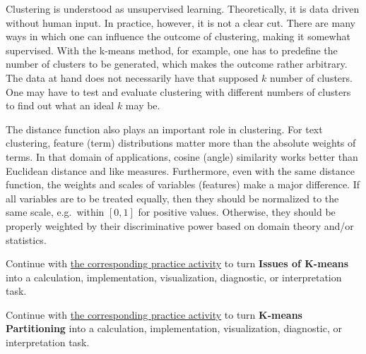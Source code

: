 \documentclass[
  letterpaper,
]{scrbook}
\begin{document}
Clustering is understood as unsupervised learning. Theoretically, it is
data driven without human input. In practice, however, it is not a clear
cut. There are many ways in which one can influence the outcome of
clustering, making it somewhat supervised. With the k-means method, for
example, one has to predefine the number of clusters to be generated,
which makes the outcome rather arbitrary. The data at hand does not
necessarily have that supposed \(k\) number of clusters. One may have to
test and evaluate clustering with different numbers of clusters to find
out what an ideal \(k\) may be.

The distance function also plays an important role in clustering. For
text clustering, feature (term) distributions matter more than the
absolute weights of terms. In that domain of applications, cosine
(angle) similarity works better than Euclidean distance and like
measures. Furthermore, even with the same distance function, the weights
and scales of variables (features) make a major difference. If all
variables are to be treated equally, then they should be normalized to
the same scale, e.g.~within \([0,1]\) for positive values. Otherwise,
they should be properly weighted by their discriminative power based on
domain theory and/or statistics.

\begin{tcolorbox}[enhanced jigsaw, arc=.35mm, bottomrule=.15mm, bottomtitle=1mm, breakable, colback=white, colbacktitle=quarto-callout-tip-color!10!white, colframe=quarto-callout-tip-color-frame, coltitle=black, left=2mm, leftrule=.75mm, opacityback=0, opacitybacktitle=0.6, rightrule=.15mm, title=\textcolor{quarto-callout-tip-color}{\faLightbulb}\hspace{0.5em}{Put it into practice}, titlerule=0mm, toprule=.15mm, toptitle=1mm]

Continue with \hyperref[sec-pr-10-issues-of-k-means]{the corresponding
practice activity} to turn \textbf{Issues of K-means} into a
calculation, implementation, visualization, diagnostic, or
interpretation task.

\end{tcolorbox}

\begin{tcolorbox}[enhanced jigsaw, arc=.35mm, bottomrule=.15mm, bottomtitle=1mm, breakable, colback=white, colbacktitle=quarto-callout-tip-color!10!white, colframe=quarto-callout-tip-color-frame, coltitle=black, left=2mm, leftrule=.75mm, opacityback=0, opacitybacktitle=0.6, rightrule=.15mm, title=\textcolor{quarto-callout-tip-color}{\faLightbulb}\hspace{0.5em}{Put it into practice}, titlerule=0mm, toprule=.15mm, toptitle=1mm]

Continue with \hyperref[sec-pr-10-k-means-partitioning]{the
corresponding practice activity} to turn \textbf{K-means Partitioning}
into a calculation, implementation, visualization, diagnostic, or
interpretation task.

\end{tcolorbox}
\end{document}

